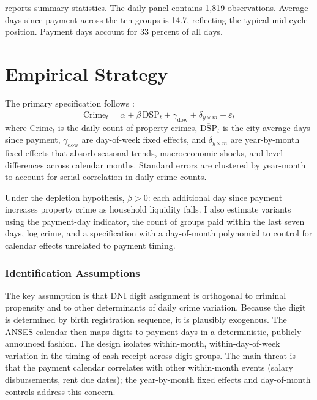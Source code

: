 \documentclass[12pt]{article}
\begin{document}
 reports summary statistics. The daily panel contains 1,819 observations. Average days since payment across the ten groups is 14.7, reflecting the typical mid-cycle position. Payment days account for 33 percent of all days.




\section{Empirical Strategy}
\label{sec:strategy}

The primary specification follows \citet{foley2011}:
\begin{equation}
\text{Crime}_t = \alpha + \beta\, \overline{\text{DSP}}_t + \gamma_{\text{dow}} + \delta_{y \times m} + \varepsilon_t
\label{eq:main}
\end{equation}
where $\text{Crime}_t$ is the daily count of property crimes, $\overline{\text{DSP}}_t$ is the city-average days since payment, $\gamma_{\text{dow}}$ are day-of-week fixed effects, and $\delta_{y \times m}$ are year-by-month fixed effects that absorb seasonal trends, macroeconomic shocks, and level differences across calendar months. Standard errors are clustered by year-month to account for serial correlation in daily crime counts.

Under the depletion hypothesis, $\beta > 0$: each additional day since payment increases property crime as household liquidity falls. I also estimate variants using the payment-day indicator, the count of groups paid within the last seven days, log crime, and a specification with a day-of-month polynomial to control for calendar effects unrelated to payment timing.

\subsubsection*{Identification Assumptions} The key assumption is that DNI digit assignment is orthogonal to criminal propensity and to other determinants of daily crime variation. Because the digit is determined by birth registration sequence, it is plausibly exogenous. The ANSES calendar then maps digits to payment days in a deterministic, publicly announced fashion. The design isolates within-month, within-day-of-week variation in the timing of cash receipt across digit groups. The main threat is that the payment calendar correlates with other within-month events (salary disbursements, rent due dates); the year-by-month fixed effects and day-of-month controls address this concern.
\end{document}
